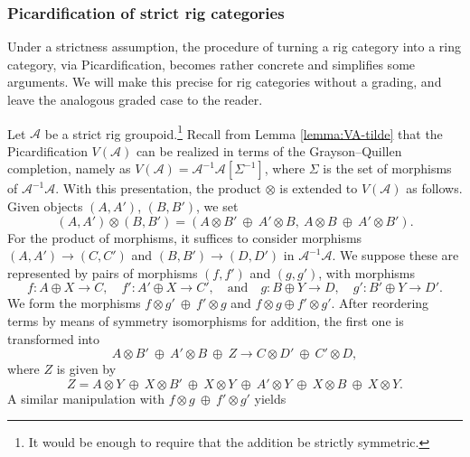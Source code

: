 \documentclass[11pt]{article}
\newcommand{\quand}{\quad\text{and}\quad}
\theoremstyle{plain}
\theoremstyle{definition}
\newcommand{\Acal}{\mathcal A}
\begin{document}
\subsubsection{Picardification of strict rig categories}\label{subsubsec:strict-rig-categories}
Under a strictness assumption, the procedure of turning a rig category into a ring category, via Picardification, becomes rather concrete and simplifies some arguments. We will make this precise for rig categories without a grading, and leave the analogous graded case to the reader.

Let $\Acal$ be a strict rig groupoid.\footnote{It would be enough to require that the addition be strictly symmetric.} Recall from Lemma \ref{lemma:VA-tilde} that the Picardification $V(\Acal)$ can be realized in terms of the Grayson--Quillen completion, namely as \hbox{$V(\Acal)=\Acal^{-1}\Acal[\Sigma^{-1}]$}, where $\Sigma$ is the set of morphisms of $\Acal^{-1}\Acal$. With this presentation, the product $\otimes$ is extended to $V(\Acal)$ as follows. Given objects $(A,A')$, $(B,B')$, we set\vspace*{-3pt}
\begin{equation}\label{eq:explicit-product-A-A}
(A,A')\otimes (B,B')=(A\otimes B'\ \oplus\ A'\otimes B,\ A\otimes B\ \oplus\ A'\otimes B').
\end{equation}
For the product of morphisms, it suffices to consider morphisms $(A,A')\to (C,C')$ and $(B,B')\to (D,D')$ in $\Acal^{-1}\Acal$. We suppose these are represented by pairs of morphisms $(f,f')$ and $(g,g')$, with morphisms\vspace*{-3pt}
\[
f\colon A\oplus X\to C,\quad f'\colon A'\oplus X\to C',\quand g\colon B\oplus Y\to D,\quad g'\colon B'\oplus Y\to D'.
\]
We form the morphisms $f\otimes g'\ \oplus\ f'\otimes g$ and $f\otimes g\oplus f'\otimes g'$. After reordering terms by means of symmetry isomorphisms for addition, the first one is transformed into\vspace*{-3pt}
\begin{equation}\label{eq:product-morphism-1}
A\otimes B'\ \oplus\ A'\otimes B\ \oplus\ Z\to C\otimes D'\ \oplus\ C'\otimes D,
\end{equation}
where $Z$ is given by\vspace*{-3pt}
\begin{displaymath}
Z=A\otimes Y\ \oplus\ X\otimes B'\ \oplus\ X\otimes Y\ \oplus\ A'\otimes Y\ \oplus\ X\otimes B\ \oplus\ X\otimes Y.
\end{displaymath}
A similar manipulation with $f\otimes g\ \oplus\ f'\otimes g'$ yields\vspace*{-3pt}
\end{document}
